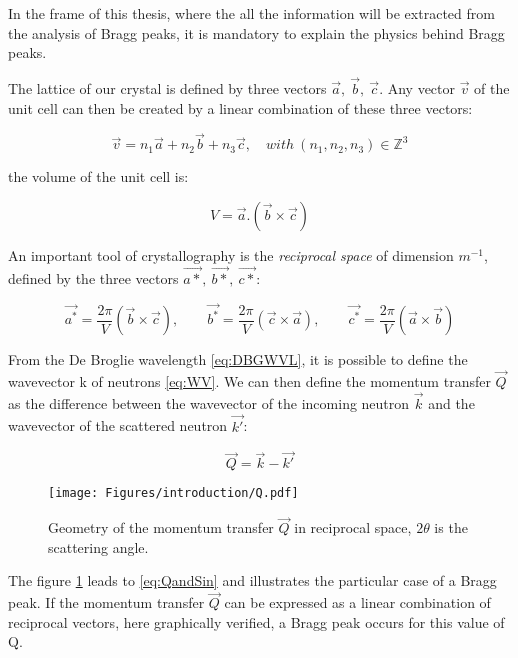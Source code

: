 In the frame of this thesis, where the all the information will be extracted from the analysis of Bragg peaks, it is mandatory to explain the physics behind Bragg peaks.

The lattice of our crystal is defined by three vectors $\vec{a},\ \vec{b},\ \vec{c}$. Any vector $\vec{v}$ of the unit cell can then be created by a linear combination of these three vectors:

\begin{equation}
    \vec{v}=n_1\vec{a} + n_2\vec{b} + n_3\vec{c}, \quad with \ (n_1,n_2,n_3) \in \mathbb{Z}^3
\end{equation}{}

the volume of the unit cell is:

\begin{equation}
    V=\vec{a}.(\vec{b}\times \vec{c})
\end{equation}{}

An important tool of crystallography is the \textit{reciprocal space} of dimension $m^{-1}$, defined by the three vectors $\vec{a*},\ \vec{b*},\ \vec{c*}$:

\begin{equation}
    \vec{a^*}=\frac{2\pi}{V}(\vec{b}\times \vec{c}), \qquad
    \vec{b^*}=\frac{2\pi}{V}(\vec{c}\times \vec{a}), \qquad
    \vec{c^*}=\frac{2\pi}{V}(\vec{a}\times \vec{b})
\end{equation}{}

From the De Broglie wavelength \eqref{eq:DBGWVL}, it is possible to define the wavevector k of neutrons \eqref{eq:WV}. We can then define the momentum transfer $\vec{Q}$ as the difference between the wavevector of the incoming neutron $\vec{k}$ and the wavevector of the scattered neutron $\vec{k'}$:

\begin{equation}
    \label{eq:Q}
    \vec{Q}=\vec{k}-\vec{k'}
\end{equation}{}

\begin{figure}[htb]
    \centering
    \texttt{[image: Figures/introduction/Q.pdf]}
    \caption{Geometry of the momentum transfer $\vec{Q}$ in reciprocal space, $2\theta$ is the scattering angle.}
    \label{fig:Q}
\end{figure}

The figure \ref{fig:Q} leads to \eqref{eq:QandSin} and illustrates the particular case of a Bragg peak. If the momentum transfer $\vec{Q}$ can be expressed as a linear combination of reciprocal vectors, here graphically verified, a Bragg peak occurs for this value of Q.

